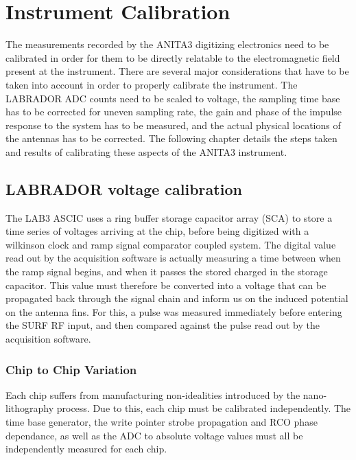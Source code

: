 			
			
			
			
			
\chapter{Instrument Calibration}

	The measurements recorded by the ANITA3 digitizing electronics need to be calibrated in order for them to be directly relatable to the electromagnetic field present at the instrument.  There are several major considerations that have to be taken into account in order to properly calibrate the instrument.  The LABRADOR ADC counts need to be scaled to voltage, the sampling time base has to be corrected for uneven sampling rate, the gain and phase of the impulse response to the system has to be measured, and the actual physical locations of the antennas has to be corrected.  The following chapter details the steps taken and results of calibrating these aspects of the ANITA3 instrument.
	
	
\section{LABRADOR voltage calibration}
	
		The LAB3 ASCIC uses a ring buffer storage capacitor array (SCA) to store a time series of voltages arriving at the chip, before being digitized with a wilkinson clock and ramp signal comparator coupled system.  The digital value read out by the acquisition software is actually measuring a time between when the ramp signal begins, and when it passes the stored charged in the storage capacitor.  This value must therefore be converted into a voltage that can be propagated back through the signal chain and inform us on the induced potential on the antenna fins.  For this, a pulse was measured immediately before entering the SURF RF input, and then compared against the pulse read out by the acquisition software.
		
	\subsection{Chip to Chip Variation}
		Each chip suffers from manufacturing non-idealities introduced by the nano-lithography process.  Due to this, each chip must be calibrated independently.  The time base generator, the write pointer strobe propagation and RCO phase dependance, as well as the ADC to absolute voltage values must all be independently measured for each chip.



